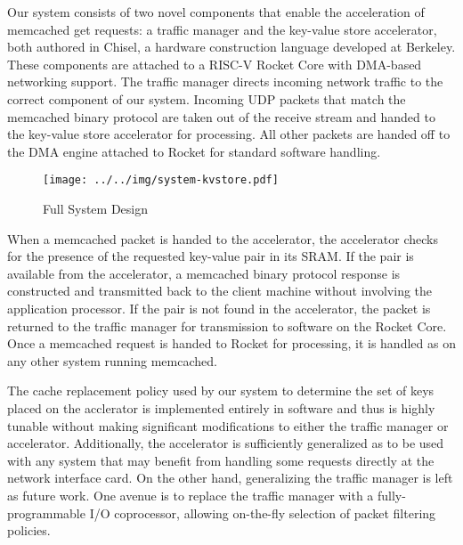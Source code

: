 Our system consists of two novel components that enable the acceleration of 
memcached get requests: a traffic manager and the key-value store accelerator, 
both authored in Chisel, a hardware construction language developed at Berkeley.
These components are attached to a RISC-V Rocket Core with DMA-based networking 
support. The traffic manager directs incoming network traffic to the correct 
component of our system. Incoming UDP packets that match the memcached binary 
protocol are taken out of the receive stream and handed to the key-value store 
accelerator for processing. All other packets are handed off to the DMA 
engine attached to Rocket for standard software handling.

\begin{figure}[t]
\begin{center}
\label{fig:full-sys}
\texttt{[image: ../../img/system-kvstore.pdf]}
\caption{Full System Design}
\end{center}
\end{figure}

When a memcached packet is handed to the accelerator, the accelerator checks 
for the presence of the requested key-value pair in its SRAM. If the pair is
available from the accelerator, a memcached binary protocol response is 
constructed and transmitted back to the client machine without involving the 
application processor. If the pair is not found in the accelerator, the packet 
is returned to the traffic manager for transmission to software on the Rocket 
Core. Once a memcached request is handed to Rocket for processing, it is 
handled as on any other system running memcached.

The cache replacement policy used by our system to determine the set of keys
placed on the acclerator is implemented entirely in software and thus is 
highly tunable without making significant modifications to either the traffic
manager or accelerator. Additionally, the accelerator is sufficiently 
generalized as to be used with any system that may benefit from handling some
requests directly at the network interface card. On the other hand, 
generalizing the traffic manager is left as future work. One avenue is to 
replace the traffic manager with a fully-programmable I/O coprocessor, allowing
on-the-fly selection of packet filtering policies.



